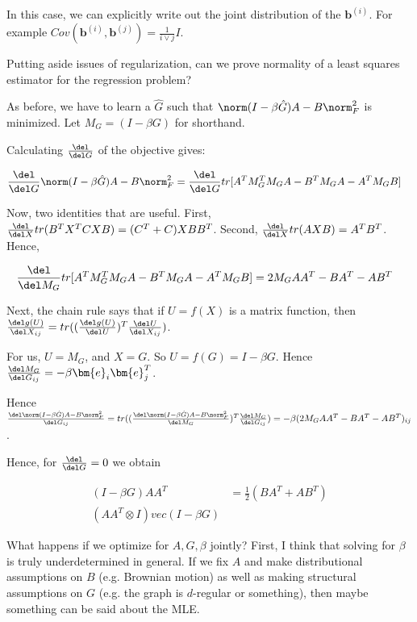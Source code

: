 In this case, we can explicitly write out the joint distribution of the $\bm{b}^{(i)}$. For example $Cov(\bm{b}^{(i)}, \bm{b}^{(j)}) = \frac{1}{i \lor j} I$. 

Putting aside issues of regularization, can we prove normality of a least squares estimator for the regression problem? 

As before, we have to learn a $\hat G$ such that $\norm (I - \beta \hat G) A - B \norm_F^2$ is minimized. Let $M_G = (I - \beta G)$ for shorthand. 

Calculating $\frac{\del}{\del G}$ of the objective gives:

\begin{align*}
\frac{\del}{\del G} \norm (I - \beta \hat G) A - B \norm_F^2
&= \frac{\del}{\del G} tr[
A^T M_G^T M_G A - B^T M_G A - A^T M_G B
]
\end{align*}

Now, two identities that are useful. First, $\frac{\del}{\del X}tr(B^T X^T C X B) = (C^T + C) X BB^T$. Second, $\frac{\del}{\del X} tr(AXB) = A^T B^T$. Hence, 

\begin{align*}
\frac{\del}{\del M_G} tr[
A^T M_G^T M_G A - B^T M_G A - A^T M_G B
] 
&= 2M_G AA^T - BA^T - AB^T    
\end{align*}

Next, the chain rule says that if $U = f(X)$ is a matrix function, then $\frac{\del g(U)}{\del X_{ij}} = tr((\frac{\del g(U)}{\del U})^T \frac{\del U}{\del X_{ij}})$. 

For us, $U = M_G$, and $X = G$. So $U = f(G) = I - \beta G$. Hence $\frac{\del M_G}{\del G_{ij}} = -\beta \bm{e}_i \bm{e}_j^T$. 

Hence $\frac{\del \norm (I - \beta \hat G) A - B \norm_F^2}{\del G_{ij}} = tr((\frac{\del \norm (I - \beta \hat G) A - B \norm_F^2}{\del M_G})^T \frac{\del M_G}{\del G_{ij}}) = -\beta (2M_G AA^T - BA^T - AB^T )_{ij}$. 

Hence, for $\frac{\del}{\del G} = 0$ we obtain 

\begin{align*}
(I - \beta G) AA^T &= \frac{1}{2} (BA^T + AB^T) \\
(AA^T \otimes I) vec(I - \beta G) 
\end{align*}

What happens if we optimize for $A, G, \beta$ jointly? First, I think that solving for $\beta$ is truly underdetermined in general. If we fix $A$ and make distributional assumptions on $B$ (e.g. Brownian motion) as well as making structural assumptions on $G$ (e.g. the graph is $d$-regular or something), then maybe something can be said about the MLE. 

